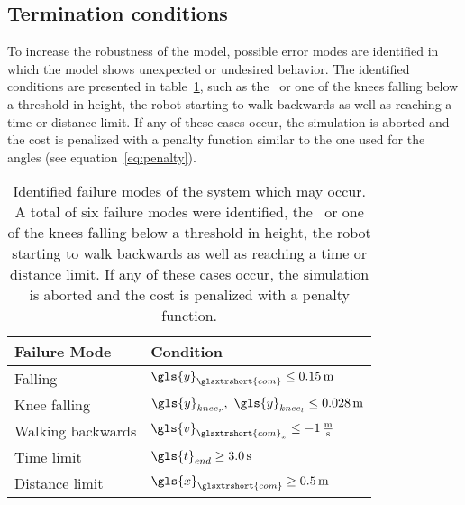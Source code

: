 
        \subsection*{Termination conditions}

        To increase the robustness of the model, possible error modes are identified in which the model shows unexpected or undesired behavior. The identified conditions are presented in table~\ref{tab:failure-modes}, such as the~ or one of the knees falling below a threshold in height, the robot starting to walk backwards as well as reaching a time or distance limit. If any of these cases occur, the simulation is aborted and the cost is penalized with a penalty function similar to the one used for the angles (see equation~\ref{eq:penalty}).
        
        \begin{table}[H]
            \caption{Identified failure modes of the system which may occur. A total of six failure modes were identified, the~ or one of the knees falling below a threshold in height, the robot starting to walk backwards as well as reaching a time or distance limit. If any of these cases occur, the simulation is aborted and the cost is penalized with a penalty function.} \label{tab:failure-modes}
            \begin{center}
                \begin{tabular}{ l|l }
                    \textbf{Failure Mode} & \textbf{Condition}                                                              \\ [0.5ex]
                    \hline \hline
                    Falling               & $\gls{y}_{\glsxtrshort{com}} \leq 0.15\,\textrm{\si{\metre}}$                      \\
                    Knee falling          & $\gls{y}_{knee_r},~\gls{y}_{knee_l} \leq 0.028\,\textrm{\si{\metre}}$                    \\
                    Walking backwards     & $\gls{v}_{\glsxtrshort{com}_x} \leq - 1\,\textrm{\si{\metre\per\second}}$  \\
                    Time limit            & $\gls{t}_{end} \geq 3.0\,\textrm{\si{\second}}$                                    \\
                    Distance limit        & $\gls{x}_{\glsxtrshort{com}} \geq 0.5\,\textrm{\si{\metre}}$
                \end{tabular}
            \end{center}
        \end{table}
    
        
